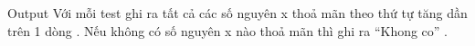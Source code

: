 Output
Với mỗi test ghi ra tất cả các số nguyên x thoả mãn theo thứ tự tăng dần trên 1 dòng . Nếu không có số nguyên x nào thoả mãn thì ghi ra “Khong co” .
